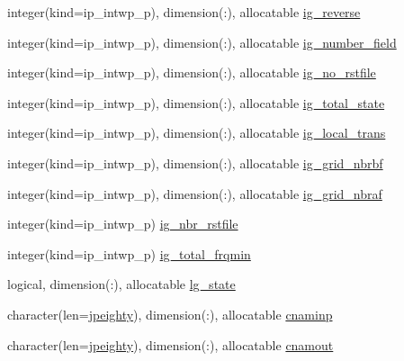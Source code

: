 \begin{DoxyCompactItemize}
\item 
integer(kind=ip\+\_\+intwp\+\_\+p), dimension(\+:), allocatable \hyperlink{namespacemod__oasis__namcouple_adc4dcf30da2b88fb1798dd02e7833bc1}{ig\+\_\+reverse}
\item 
integer(kind=ip\+\_\+intwp\+\_\+p), dimension(\+:), allocatable \hyperlink{namespacemod__oasis__namcouple_a0751f74f7ce6520d8e860b9da14d1d9d}{ig\+\_\+number\+\_\+field}
\item 
integer(kind=ip\+\_\+intwp\+\_\+p), dimension(\+:), allocatable \hyperlink{namespacemod__oasis__namcouple_a1cc3d37d7819c112f14b6cec03266561}{ig\+\_\+no\+\_\+rstfile}
\item 
integer(kind=ip\+\_\+intwp\+\_\+p), dimension(\+:), allocatable \hyperlink{namespacemod__oasis__namcouple_a7c783457d0e759e3af98b92146fa4ec3}{ig\+\_\+total\+\_\+state}
\item 
integer(kind=ip\+\_\+intwp\+\_\+p), dimension(\+:), allocatable \hyperlink{namespacemod__oasis__namcouple_a510a13e57f2f65d5ddc70c729d54c0f6}{ig\+\_\+local\+\_\+trans}
\item 
integer(kind=ip\+\_\+intwp\+\_\+p), dimension(\+:), allocatable \hyperlink{namespacemod__oasis__namcouple_ae81f2e658bbaeae20badef0fad425a69}{ig\+\_\+grid\+\_\+nbrbf}
\item 
integer(kind=ip\+\_\+intwp\+\_\+p), dimension(\+:), allocatable \hyperlink{namespacemod__oasis__namcouple_a8e8c38746c6c35b13d2d9b934835188c}{ig\+\_\+grid\+\_\+nbraf}
\item 
integer(kind=ip\+\_\+intwp\+\_\+p) \hyperlink{namespacemod__oasis__namcouple_a05148b30ca97c536b40a896153c8921f}{ig\+\_\+nbr\+\_\+rstfile}
\item 
integer(kind=ip\+\_\+intwp\+\_\+p) \hyperlink{namespacemod__oasis__namcouple_a839912711f8d2f44a825689e2673d0dd}{ig\+\_\+total\+\_\+frqmin}
\item 
logical, dimension(\+:), allocatable \hyperlink{namespacemod__oasis__namcouple_ac1be1629c1369b96a4ff08c07200a05d}{lg\+\_\+state}
\item 
character(len=\hyperlink{namespacemod__oasis__namcouple_a4fb10ad6e864dcbe34c4a8b02204a523}{jpeighty}), dimension(\+:), allocatable \hyperlink{namespacemod__oasis__namcouple_a1f6ff08cee0c3c5deb262c1447d88328}{cnaminp}
\item 
character(len=\hyperlink{namespacemod__oasis__namcouple_a4fb10ad6e864dcbe34c4a8b02204a523}{jpeighty}), dimension(\+:), allocatable \hyperlink{namespacemod__oasis__namcouple_a71ba84b9a7a813ca2551bcde99a0b5b5}{cnamout}
\item 

\end{DoxyCompactItemize}
